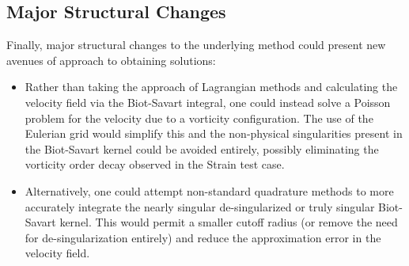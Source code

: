 \documentclass[letterpaper,12pt]{report}
\begin{document}
\subsection{Major Structural Changes}
Finally, major structural changes to the underlying method could present new avenues of approach to obtaining solutions:
\begin{itemize}
\item Rather than taking the approach of Lagrangian methods and calculating the velocity field via the Biot-Savart integral, one could instead solve a Poisson problem for the velocity due to a vorticity configuration. The use of the Eulerian grid would simplify this and the non-physical singularities present in the Biot-Savart kernel could be avoided entirely, possibly eliminating the vorticity order decay observed in the Strain test case.
\item Alternatively, one could attempt non-standard quadrature methods to more accurately integrate the nearly singular de-singularized or truly singular Biot-Savart kernel. This would permit a smaller cutoff radius (or remove the need for de-singularization entirely) and reduce the approximation error in the velocity field.
\end{itemize}
\end{document}
